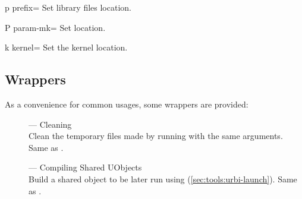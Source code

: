 \begin{options}
\item[p]{prefix=} Set library files location.
\item[P]{param-mk=} Set  location.
\item[k]{kernel=} Set the kernel location.
\end{options}


\subsection{ Wrappers}
\label{sec:tools:umake:wrappers}
\label{sec:tools:umake-shared}
\label{sec:tools:umake-deepclean}

As a convenience for common  usages, some wrappers are
provided:
\begin{description}
\item[] --- Cleaning\\
  Clean the temporary files made by running  with the
  same arguments.  Same as .
\item[] --- Compiling Shared UObjects\\
  Build a shared object to be later run using 
  (\autoref{sec:tools:urbi-launch}).  Same as .
\end{description}

